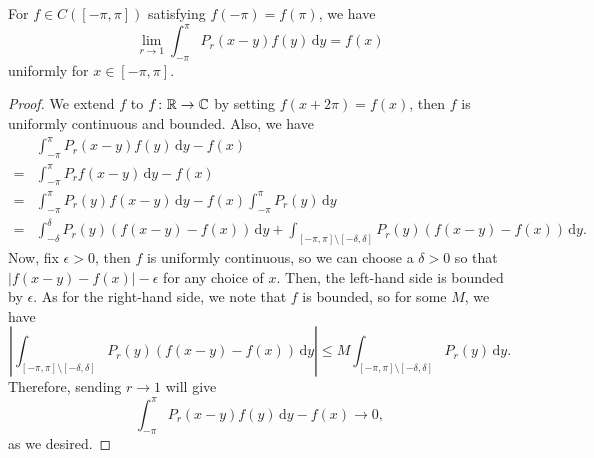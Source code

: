 \begin{lemma}
	For \(f\in C([-\pi , \pi ])\)  satisfying \(f(-\pi) = f(\pi )\), we have
	\[
		\lim\limits_{r \to 1} \int _{-\pi }^\pi P_{r} (x - y)f(y)\,\mathrm{d} y = f(x)
	\]
	uniformly for \(x\in [-\pi , \pi ]\).
\end{lemma}
\begin{proof}
	We extend \(f\) to \(f\colon \mathbb{\MakeUppercase{r}} \to \mathbb{\MakeUppercase{c}} \) by setting \(f(x + 2\pi ) = f(x)\), then \(f\) is
	uniformly continuous and bounded. Also, we have
	\[
		\begin{split}
			&\int _{-\pi }^\pi P_{r} (x - y)f(y)\,\mathrm{d} y - f(x)\\
			= &\int _{-\pi }^\pi P_{r} f(x-y)\,\mathrm{d} y - f(x)\\
			= &\int _{-\pi }^\pi P_{r} (y) f(x-y) \,\mathrm{d} y - f(x)\int _{-\pi }^\pi P_{r} (y)\,\mathrm{d} y\\
			= &\int _{-\delta }^\delta P_{r} (y)(f(x-y) - f(x))\,\mathrm{d} y + \int _{[-\pi , \pi ]\setminus [-\delta , \delta ]}P_{r} (y)(f(x-y) - f(x))\,\mathrm{d} y.
		\end{split}
	\]
	Now, fix \(\epsilon >0\), then \(f\) is uniformly continuous, so we can choose a \(\delta >0\) so that \(\left\vert f(x-y)-f(x) \right\vert -\epsilon \) for
	any choice of \(x\). Then, the left-hand side is bounded by \(\epsilon \). As for the right-hand side, we note that \(f\) is bounded, so for some \(M\),
	we have
	\[
		\left\vert \int _{[-\pi , \pi ]\setminus [-\delta , \delta ]}P_{r} (y)(f(x-y)-f(x)) \,\mathrm{d} y\right\vert \leq M \int _{[-\pi , \pi ]\setminus [-\delta , \delta ]}P_{r} (y)\,\mathrm{d} y.
	\]
	Therefore, sending \(r\to 1\) will give
	\[
		\int _{-\pi }^\pi P_{r} (x-y)f(y)\,\mathrm{d} y - f(x) \to 0,
	\]
	as we desired.
\end{proof}